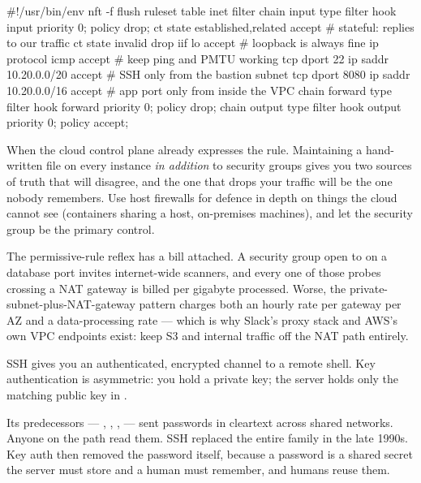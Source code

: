 \begin{bashbox}
#!/usr/bin/env nft -f
flush ruleset
table inet filter {
  chain input {
    type filter hook input priority 0; policy drop;
    ct state established,related accept   # stateful: replies to our traffic
    ct state invalid drop
    iif lo accept                         # loopback is always fine
    ip protocol icmp accept               # keep ping and PMTU working
    tcp dport 22 ip saddr 10.20.0.0/20 accept   # SSH only from the bastion subnet
    tcp dport 8080 ip saddr 10.20.0.0/16 accept # app port only from inside the VPC
  }
  chain forward { type filter hook forward priority 0; policy drop; }
  chain output  { type filter hook output  priority 0; policy accept; }
}
\end{bashbox}

 When the cloud control plane already expresses the rule. Maintaining a hand-written  file on every instance \emph{in addition} to security groups gives you two sources of truth that will disagree, and the one that drops your traffic will be the one nobody remembers. Use host firewalls for defence in depth on things the cloud cannot see (containers sharing a host, on-premises machines), and let the security group be the primary control.

\begin{costnote}
The permissive-rule reflex has a bill attached. A security group open to  on a database port invites internet-wide scanners, and every one of those probes crossing a NAT gateway is billed per gigabyte processed. Worse, the private-subnet-plus-NAT-gateway pattern charges both an hourly rate per gateway per AZ and a data-processing rate --- which is why Slack's proxy stack and AWS's own VPC endpoints exist: keep S3 and internal traffic off the NAT path entirely.
\end{costnote}


 SSH gives you an authenticated, encrypted channel to a remote shell. Key authentication is asymmetric: you hold a private key; the server holds only the matching public key in .

 Its predecessors --- , , ,  --- sent passwords in cleartext across shared networks. Anyone on the path read them. SSH replaced the entire family in the late 1990s. Key auth then removed the password itself, because a password is a shared secret the server must store and a human must remember, and humans reuse them.

